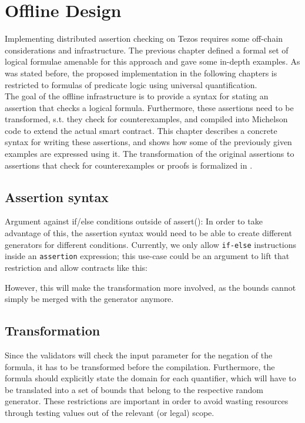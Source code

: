 \chapter{Offline Design}\label{chap:offline}
Implementing distributed assertion checking on Tezos requires some off-chain considerations and infrastructure. The previous chapter defined a formal set of logical formulae amenable for this approach and gave some in-depth examples. As was stated before, the proposed implementation in the following chapters is restricted to formulas of predicate logic using universal quantification.\\
The goal of the offline infrastructure is to provide a syntax for stating an assertion that checks a logical formula. Furthermore, these assertions need to be transformed, s.t. they check for counterexamples, and compiled into Michelson code to extend the actual smart contract. This chapter describes a concrete syntax for writing these assertions, and shows how some of the previously given examples are expressed using it. The transformation of the original assertions to assertions that check for counterexamples or proofs is formalized in . 

\section{Assertion syntax}

Argument against if/else conditions outside of assert():
In order to take advantage of this, the assertion syntax would need to be able to create different generators for different conditions. Currently, we only allow \texttt{if-else} instructions inside an \texttt{assertion} expression; this use-case could be an argument to lift that restriction and allow contracts like this:
%

However, this will make the transformation more involved, as the bounds cannot simply be merged with the generator anymore.

\section{Transformation}\label{sec:transformation}
Since the validators will check the input parameter for the negation of the formula, it has to be transformed before the compilation. Furthermore, the formula should explicitly state the domain for each quantifier, which will have to be translated into a set of bounds that belong to the respective random generator. These restrictions are important in order to avoid wasting resources through testing values out of the relevant (or legal) scope.

